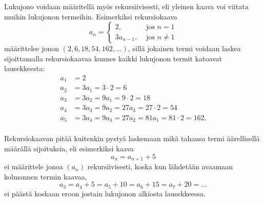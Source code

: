 Lukujono voidaan määritellä myös rekursiivisesti, eli yleinen kaava voi viitata muihin lukujonon termeihin. Esimerkiksi rekursiokaava
\[a_n = \left\{\begin{array}{ll}
2,&\text{ jos } n = 1 \\
3a_{n-1},&\text{ jos } n \neq 1
\end{array}\right.\]
määrittelee jonon $(2, 6, 18, 54, 162, \ldots)$, sillä jokainen termi voidaan laskea sijoittamalla rekursiokaavaa kunnes kaikki lukujonon termit katoavat lausekkeesta:
\begin{align*}
a_1 &= 2 \\
a_2 &= 3 a_1 = 3\cdot 2 = 6 \\
a_3 &= 3 a_2 = 9 a_1 = 9\cdot 2 = 18 \\
a_4 &= 3 a_3 = 9 a_2 = 27 a_3 = 27 \cdot 2 = 54 \\
a_5 &= 3 a_4 = 9 a_3 = 27 a_2 = 81 a_1 = 81\cdot 2 = 162. \\
\end{align*}

Rekursiokaavan pitää kuitenkin pystyä laskemaan mikä tahansa termi äärellisellä määrällä sijoituksia, eli esimerkiksi kaava
\[a_n = a_{n + 1} + 5\]
ei määrittele jonoa $(a_n)$ rekursiivisesti, koska kun lähdetään avaamaan kolmannen termin kaavaa,
\[a_3 = a_4 + 5 = a_5 + 10 = a_6 + 15 = a_7 + 20 = \ldots\]
ei päästä koskaan eroon jostain lukujonon alkiosta lausekkeessa.
